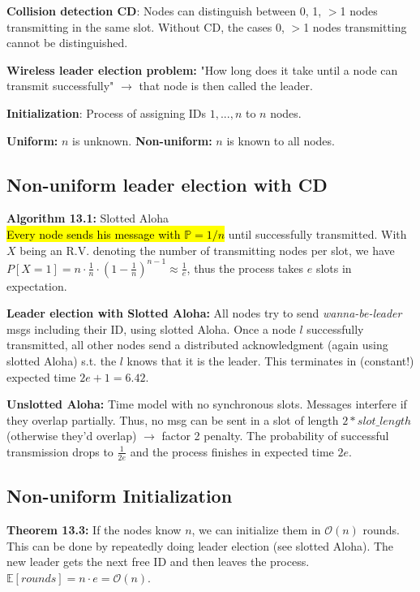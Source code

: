 \documentclass[a4paper, 8pt, landscape]{scrartcl}
\begin{document}
\begin{multicols*}{3}
\textbf{Collision detection CD}: Nodes can distinguish between 0, 1, $>$1 nodes transmitting in the same slot. Without CD, the cases 0, $>$1 nodes transmitting cannot be distinguished.

\textbf{Wireless leader election problem:} "How long does it take until a node can transmit successfully" $\rightarrow$ that node is then called the leader.

\textbf{Initialization}: Process of assigning IDs $1,..., n$ to $n$ nodes.

\textbf{Uniform:} $n$ is unknown. \textbf{Non-uniform:} $n$ is known to all nodes.

\subsection{Non-uniform leader election with CD}

\textbf{Algorithm 13.1:} Slotted Aloha\\
\hl{Every node sends his message with $\mathbb{P} = 1/n$} until successfully transmitted. With $X$ being an R.V. denoting the number of transmitting nodes per slot, we have $P[X=1] = n \cdot \frac{1}{n} \cdot (1-\frac{1}{n})^{n-1} \approx \frac{1}{e}$, thus the process takes $e$ slots in expectation.

\columnbreak

\textbf{Leader election with Slotted Aloha:} All nodes try to send \textit{wanna-be-leader} msgs including their ID, using slotted Aloha. Once a node $l$ successfully transmitted, all other nodes send a distributed acknowledgment (again using slotted Aloha) s.t. the $l$ knows that it is the leader. This terminates in (constant!) expected time $2e+1 = 6.42$. 

\textbf{Unslotted Aloha:} Time model with no synchronous slots. Messages interfere if they overlap partially. Thus, no msg can be sent in a slot of length $2*slot\_length$ (otherwise they'd overlap) $\rightarrow$ factor 2 penalty. The probability of successful transmission drops to $\frac{1}{2e}$ and the process finishes in expected time $2e$.

\subsection{Non-uniform Initialization}

\textbf{Theorem 13.3:} If the nodes know $n$, we can initialize them in $\mathcal{O}(n)$ rounds. This can be done by repeatedly doing leader election (see slotted Aloha). The new leader gets the next free ID and then leaves the process. $\mathbb{E}[rounds] = n \cdot e = \mathcal{O}(n)$.



\end{multicols*}
\end{document}
